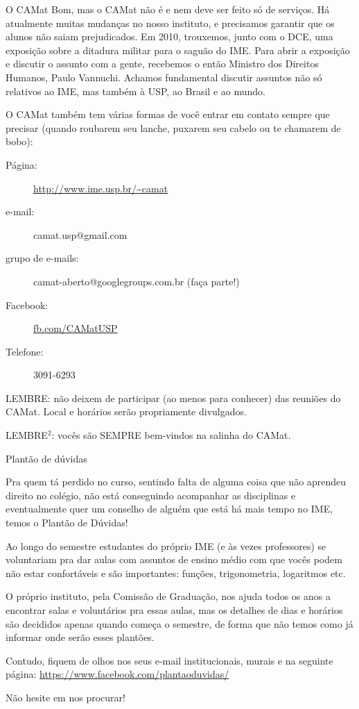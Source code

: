 \begin{secao}{O CAMat}
Bom, mas o CAMat não é e nem deve ser feito só de serviços. Há atualmente
muitas mudanças no nosso instituto, e precisamos garantir que os alunos não
saiam prejudicados. Em 2010, trouxemos, junto com o
DCE, uma exposição sobre a ditadura militar para o saguão do IME. Para abrir a
exposição e discutir o assunto com a gente, recebemos o então Ministro dos
Direitos Humanos, Paulo Vannuchi. Achamos fundamental discutir assuntos não só
relativos ao IME, mas também à USP, ao Brasil e ao mundo.

O CAMat também tem várias formas de você entrar em contato sempre que precisar
(quando roubarem seu lanche, puxarem seu cabelo ou te chamarem de bobo):

\begin{description}
\item [Página:] \url{http://www.ime.usp.br/~camat}
\item [e-mail:] camat.usp@gmail.com
\item [grupo de e-mails:] camat-aberto@googlegroups.com.br (faça parte!)
\item [Facebook:] \url{fb.com/CAMatUSP}
\item [Telefone:] 3091-6293
\end{description}

LEMBRE: não deixem de participar (ao menos para conhecer) das reuniões do
CAMat. Local e horários serão propriamente divulgados.

LEMBRE$^2$: vocês são SEMPRE bem-vindos na salinha do CAMat.

\begin{subsecao}{Plantão de dúvidas}

Pra quem tá perdido no curso, sentindo falta de alguma coisa que não aprendeu
direito no colégio, não está conseguindo acompanhar as disciplinas e
eventualmente quer um conselho de alguém que está há mais tempo no IME, temos o
Plantão de Dúvidas! 

Ao longo do semestre estudantes do próprio IME (e às vezes professores) se
voluntariam pra dar aulas com assuntos de ensino médio com que vocês podem não
estar confortáveis e são importantes: funções, trigonometria, logaritmos etc.

O próprio instituto, pela Comissão de Graduação, nos ajuda todos os anos a
encontrar salas e voluntários pra essas aulas, mas os detalhes de dias e
horários são decididos apenas quando começa o semestre, de forma que não temos
como já informar onde serão esses plantões. 

Contudo, fiquem de olhos nos seus e-mail institucionais, murais e na seguinte
página: \url{https://www.facebook.com/plantaoduvidas/}

Não hesite em nos procurar!

\end{subsecao}

\end{secao}
